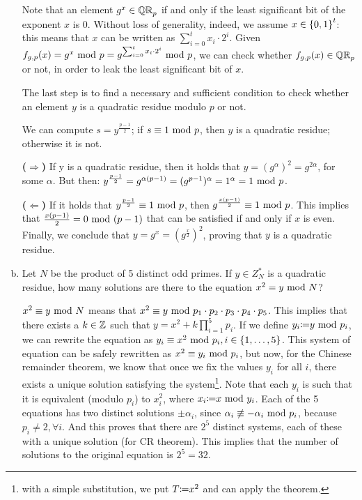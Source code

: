 \begin{enumerate}[(a)]
\begin{solution}
		      Note that an element $g^x \in {\mathbb{QR}}_p$ if and only if the least significant bit of the exponent $x$ is $0$. Without loss of generality, indeed, we assume $x \in {\{0, 1\}}^t$: this means that $x$ can be written as $\sum_{i=0}^{t} x_i \cdot 2^i$. Given $f_{g,p}(x) = g^x \mbox{ mod } p = g^{\sum_{i=0}^{t} x_i \cdot 2^i} \mbox{ mod } p$, we can check whether $f_{g,p}(x) \in {\mathbb{QR}}_p$ or not, in order to leak the least significant bit of $x$.

		      The last step is to find a necessary and sufficient condition to check whether an element $y$ is a quadratic residue modulo $p$ or not.

		      We can compute $s = y^{\frac{p-1}{2}}$; if $s \equiv 1 \mbox{ mod } p$, then $y$ is a quadratic residue; otherwise it is not.

		      \bigskip
		      \textbf{($\Rightarrow$)}
		      If y is a quadratic residue, then it holds that $y = (g^\alpha)^2 = g^{2\alpha}$, for some $\alpha$. But then: $y^{\frac{p-1}{2}} = g^{\alpha (p-1)} = (g^{p-1})^\alpha = 1^\alpha = 1 \mbox{ mod } p$.

		      \bigskip
		      \textbf{($\Leftarrow$)}
		      If it holds that $y^{\frac{p-1}{2}} \equiv 1 \mbox{ mod } p$, then $g^{\frac{x(p-1)}{2}} \equiv 1 \mbox{ mod } p$. This implies that $\frac{x(p-1)}{2} = 0 \mbox{ mod } (p-1)$ that can be satisfied if and only if $x$ is even. Finally, we conclude that $y = g^x = (g^{\frac{x}{2}})^2$, proving that $y$ is a quadratic residue.

	      \end{solution}

	\item Let $N$ be the product of 5 distinct odd primes. If $y \in Z^*_N$ is a quadratic residue, how many solutions are there to the equation $x^2 = y \mbox{ mod } N$?

	      \begin{solution}
		      $x^2 \equiv y \mbox{ mod } N$ means that $x^2 \equiv y \mbox{ mod } p_1\cdot p_2\cdot p_3\cdot p_4\cdot p_5$. This implies that there exists a $k \in {\mathbb Z}$ such that $y = x^2 + k\prod_{i=1}^{5}p_i$. If we define $y_i{\coloneqq} y \mbox{ mod } p_i$, we can rewrite the equation as $y_i \equiv x^2 \mbox{ mod } p_i, i \in \{1, \dots, 5\}$. This system of equation can be safely rewritten as $x^2 \equiv y_i \mbox{ mod } p_i$, but now, for the Chinese remainder theorem, we know that once we fix the values $y_i$ for all $i$, there exists a unique solution satisfying the system\footnote{with a simple substitution, we put $T{\coloneqq} x^2$ and can apply the theorem.}. Note that each $y_i$ is such that it is equivalent (modulo $p_i$) to $x_i^2$, where $x_i {\coloneqq} x \mbox{ mod } y_i$. Each of the 5 equations has two distinct solutions $\pm \alpha_i$, since $\alpha_i \not\equiv -\alpha_i \mbox{ mod } p_i$, because $p_i \ne 2, \forall i$. And this proves that there are $2^5$ distinct systems, each of these with a unique solution (for CR theorem). This implies that the number of solutions to the original equation is $2^5 = 32$.
	      \end{solution}
\end{enumerate}